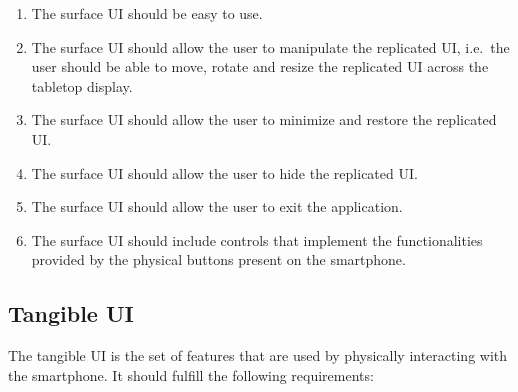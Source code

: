 \begin{enumerate}[{RC}-1]
\item The surface UI should be easy to use.
\item The surface UI should allow the user to manipulate the replicated UI, i.e.\ the user should be able to move, rotate and resize the replicated UI across the tabletop display.
\item The surface UI should allow the user to minimize and restore the replicated UI.
\item The surface UI should allow the user to hide the replicated UI.
\item The surface UI should allow the user to exit the application.
\item The surface UI should include controls that implement the functionalities provided by the physical buttons present on the smartphone.
\end{enumerate}


%
%
%

\subsection{Tangible UI}

The tangible UI is the set of features that are used by physically interacting with the smartphone.
It should fulfill the following requirements:

